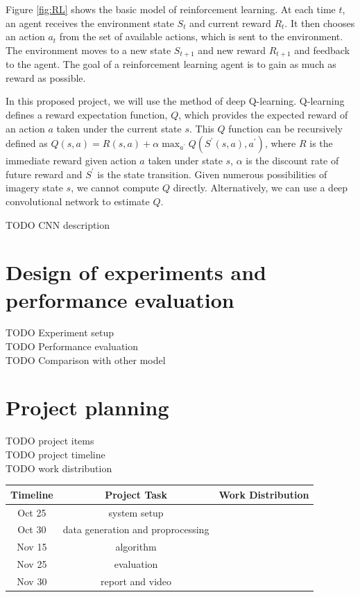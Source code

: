 \documentclass[a4paper]{article}
\begin{document}
Figure \ref{fig:RL} shows the basic model of reinforcement learning. At each time $t$, an agent
receives the environment state $S_t$ and current reward $R_t$. It then chooses an action $a_t$
from the set of available actions, which is sent to the environment. The environment moves
to a new state $S_{t+1}$ and new reward $R_{t+1}$ and feedback to the agent. The goal of a
reinforcement learning agent is to gain as much as reward as possible.


In this proposed project, we will use the method of deep Q-learning. Q-learning defines a reward
expectation function, $Q$, which provides the expected reward of an action $a$ taken under the
current state $s$. This $Q$ function can be recursively defined as $Q(s,a) = R(s,a) + \alpha
\max_{a^{'}} Q(S^{'}(s,a),a^{'})$, where $R$ is the immediate reward given action $a$ taken under
state $s$, $\alpha$ is the discount rate of future reward and $S^{'}$ is the state transition.
Given numerous possibilities of imagery state $s$, we cannot compute $Q$ directly. Alternatively,
we can use a deep convolutional network to estimate $Q$.

TODO CNN description\\

\section{Design of experiments and performance evaluation}

TODO Experiment setup\\
TODO Performance evaluation\\
TODO Comparison with other model\\

\section {Project planning}

TODO project items\\
TODO project timeline\\
TODO work distribution\\

\begin{center}
    \begin{tabular}{ | c | c | c | } 
        \hline
        Timeline & Project Task & Work Distribution   \\ 
        \hline
        Oct 25   & system setup &   \\ 
        \hline
        Oct 30   & data generation and proprocessing &   \\ 
        \hline
        Nov 15   & algorithm  &   \\ 
        \hline
        Nov 25   & evaluation  &   \\ 
        \hline
        Nov 30   & report and video  &   \\ 
        \hline
    \end{tabular}
\end{center}
\end{document}
